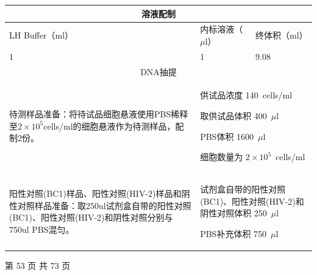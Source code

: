 \documentclass[UTF8,10pt,a4paper,fontset=fandol]{ctexart}
\newcommand{\fieldvalue}[1]{#1}
\newcommand{\handwritten}[1]{#1}
\begin{document}
\begin{center}
\begin{tabular}{|p{5.5cm}|p{5.5cm}|p{5.5cm}|}
\hline
\multicolumn{3}{|c|}{溶液配制} \\ \hline
LH Buffer（ml） & 内标溶液（$\mu$l） & 终体积（ml） \\ \hline
\fieldvalue{\handwritten{1}} &
\fieldvalue{\handwritten{1}} &
\fieldvalue{\handwritten{9.08}}
\\ \hline
\multicolumn{3}{|c|}{DNA抽提} \\ \hline
\multicolumn{1}{|p{8.5cm}|}{待测样品准备：将待试品细胞悬液使用PBS稀释至$2\times10^{5}$cells/ml的细胞悬液作为待测样品，配制2份。} &
\multicolumn{2}{p{8.5cm}|}{供试品浓度\quad
\fieldvalue{\handwritten{140}}\ cells/ml

取供试品体积\quad
\fieldvalue{\handwritten{400}}\ $\mu$l

PBS体积\quad
\fieldvalue{\handwritten{1600}}\ $\mu$l

细胞数量为\quad
\fieldvalue{\handwritten{$2\times10^{5}$}}\ cells/ml}
\\ \hline
阳性对照(BC1)样品、阳性对照(HIV-2)样品和阴性对照样品准备：取250ul试剂盒自带的阳性对照(BC1)、阳性对照(HIV-2)和阴性对照分别与750ul PBS混匀。 &
\multicolumn{2}{p{8.5cm}|}{试剂盒自带的阳性对照(BC1)、阳性对照(HIV-2)和阴性对照体积\quad
\fieldvalue{\handwritten{250}}\ $\mu$l

PBS补充体积\quad
\fieldvalue{\handwritten{750}}\ $\mu$l}
\\ \hline
\end{tabular}
\end{center}

\begin{center}
第 53 页 共 73 页
\end{center}

\newpage
\end{document}
